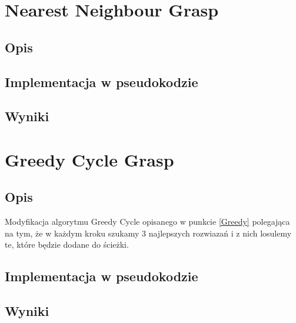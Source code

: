 \documentclass[a4paper 10pt]{article}
\begin{document}
\section{Nearest Neighbour Grasp}
\subsection{Opis}
\subsection{Implementacja w pseudokodzie}
\subsection{Wyniki}

\section{Greedy Cycle Grasp}
\subsection{Opis}
Modyfikacja algorytmu Greedy Cycle opisanego w punkcie \ref{Greedy} polegająca na tym, że w każdym kroku szukamy 3 najlepszych rozwiazań i z nich losulemy te, które będzie dodane do ścieżki.
\subsection{Implementacja w pseudokodzie}
\subsection{Wyniki}
\end{document}
